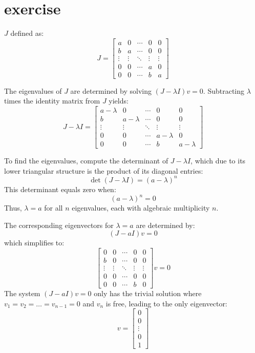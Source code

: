 \documentclass{article}
\begin{document}
\section{exercise}
\( J \) defined as:
\[
    J =
    \begin{bmatrix}
        a      & 0      & \cdots & 0      & 0      \\
        b      & a      & \cdots & 0      & 0      \\
        \vdots & \vdots & \ddots & \vdots & \vdots \\
        0      & 0      & \cdots & a      & 0      \\
        0      & 0      & \cdots & b      & a
    \end{bmatrix}
\]

The eigenvalues of \( J \) are determined by solving \( (J - \lambda I)v = 0 \). Subtracting \( \lambda \) times the identity matrix from \( J \) yields:
\[
    J - \lambda I =
    \begin{bmatrix}
        a-\lambda & 0         & \cdots & 0         & 0         \\
        b         & a-\lambda & \cdots & 0         & 0         \\
        \vdots    & \vdots    & \ddots & \vdots    & \vdots    \\
        0         & 0         & \cdots & a-\lambda & 0         \\
        0         & 0         & \cdots & b         & a-\lambda
    \end{bmatrix}
\]

To find the eigenvalues, compute the determinant of \( J - \lambda I \), which due to its lower triangular structure is the product of its diagonal entries:
\[
    \det(J - \lambda I) = (a-\lambda)^n
\]
This determinant equals zero when:
\[
    (a-\lambda)^n = 0
\]
Thus, \(\lambda = a\) for all \(n\) eigenvalues, each with algebraic multiplicity \(n\).

The corresponding eigenvectors for \( \lambda = a \) are determined by:
\[
    (J - aI)v = 0
\]
which simplifies to:
\[
    \begin{bmatrix}
        0      & 0      & \cdots & 0      & 0      \\
        b      & 0      & \cdots & 0      & 0      \\
        \vdots & \vdots & \ddots & \vdots & \vdots \\
        0      & 0      & \cdots & 0      & 0      \\
        0      & 0      & \cdots & b      & 0
    \end{bmatrix}
    v = 0
\]
The system \( (J - aI)v = 0 \) only has the trivial solution where \( v_1 = v_2 = \ldots = v_{n-1} = 0 \) and \( v_n \) is free,
leading to the only eigenvector:
\[
    v = \begin{bmatrix} 0 \\ 0 \\ \vdots \\ 0 \\ 1 \end{bmatrix}
\]
\end{document}
